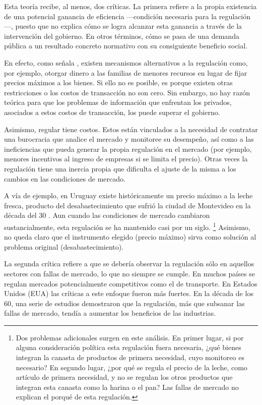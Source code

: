 \documentclass[
  12pt,
  spanish,
]{book}
\begin{document}
Esta teoría recibe, al menos, dos críticas. La primera refiere a la propia existencia de una potencial ganancia de eficiencia ---condición necesaria para la regulación---, puesto que no explica cómo se logra alcanzar esta ganancia a través de la intervención del gobierno. En otros términos, cómo se pasa de una demanda pública a un resultado concreto normativo con su consiguiente beneficio social.

En efecto, como señala \citet{Noll1989}, existen mecanismos alternativos a la regulación como, por ejemplo, otorgar dinero a las familias de menores recursos en lugar de fijar precios máximos a los bienes. Si ello no es posible, es porque existen otras restricciones o los costos de transacción no son cero. Sin embargo, no hay razón teórica para que los problemas de información que enfrentan los privados, asociados a estos costos de transacción, los puede superar el gobierno.

Asimismo, regular tiene costos. Estos están vinculados a la necesidad de contratar una burocracia que analice el mercado y monitoree su desempeño, así como a las ineficiencias que pueda generar la propia regulación en el mercado (por ejemplo, menores incentivos al ingreso de empresas si se limita el precio). Otras veces la regulación tiene una inercia propia que dificulta el ajuste de la misma a los cambios en las condiciones de mercado.

A vía de ejemplo, en Uruguay existe históricamente un precio máximo a la leche fresca, producto del desabastecimiento que sufrió la ciudad de Montevideo en la década del 30 \citep{Marti2013}. Aun cuando las condiciones de mercado cambiaron sustancialmente, esta regulación se ha mantenido casi por un siglo.
\footnote{Dos problemas adicionales surgen en este análisis. En primer lugar, si por alguna consideración política esta regulación fuera necesaria, ¿qué bienes integran la canasta de productos de primera necesidad, cuyo monitoreo es necesario? En segundo lugar, ¿por qué se regula el precio de la leche, como artículo de primera necesidad, y no se regulan los otros productos que integran esta canasta como la harina o el pan? Las fallas de mercado no explican el porqué de esta regulación.}
Asimismo, no queda claro que el instrumento elegido (precio máximo) sirva como solución al problema original (desabastecimiento).

La segunda crítica refiere a que se debería observar la regulación sólo en aquellos sectores con fallas de mercado, lo que no siempre se cumple. En muchos países se regulan mercados potencialmente competitivos como el de transporte. En Estados Unidos (EUA) las críticas a este enfoque fueron más fuertes. En la década de los 60, una serie de estudios demostraron que la regulación, más que subsanar las fallas de mercado, tendía a aumentar los beneficios de las industrias.
\end{document}
